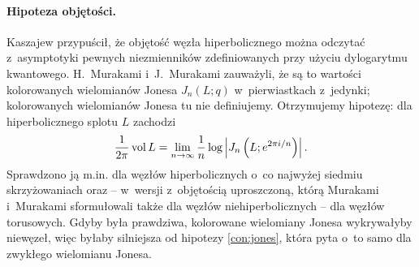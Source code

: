 \paragraph{Hipoteza objętości.}
Kaszajew \cite{kashaev1996} przypuścił, że objętość węzła hiperbolicznego można odczytać z~asymptotyki pewnych niezmienników zdefiniowanych przy użyciu dylogarytmu kwantowego.
H.~Murakami i~J.~Murakami \cite{murakami2001} zauważyli, że są to wartości kolorowanych wielomianów Jonesa $J_n(L; q)$ w~pierwiastkach z~jedynki; kolorowanych wielomianów Jonesa tu nie definiujemy.
Otrzymujemy hipotezę: dla hiperbolicznego splotu $L$ zachodzi
\begin{equation}
    \frac{1}{2\pi} \operatorname{vol} L = \lim_{n \to \infty} \frac{1}{n} \log \left| J_n\left(L; e^{2 \pi i / n}\right) \right|.
\end{equation}
%
%
%
Sprawdzono ją m.in. dla węzłów hiperbolicznych o~co najwyżej siedmiu skrzyżowaniach oraz -- w~wersji z~objętością uproszczoną, którą Murakami i~Murakami sformułowali także dla węzłów niehiperbolicznych -- dla węzłów torusowych.
Gdyby była prawdziwa, kolorowane wielomiany Jonesa wykrywałyby niewęzeł, więc byłaby silniejsza od hipotezy \ref{con:jones}, która pyta o~to samo dla zwykłego wielomianu Jonesa.

